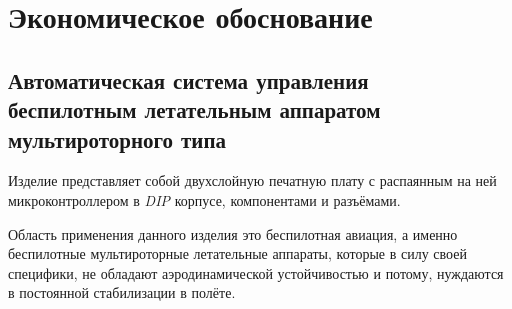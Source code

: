 \section{Экономическое обоснование}








\subsection{Автоматическая система управления \\
  беспилотным летательным аппаратом\\
мультироторного типа}

Изделие представляет собой двухслойную печатную плату с распаянным на
ней микроконтроллером в \textit{DIP} корпусе, компонентами и
разъёмами.

Область применения данного изделия это беспилотная авиация, а именно
беспилотные мультироторные летательные аппараты, которые в силу своей
специфики, не обладают аэродинамической устойчивостью и потому,
нуждаются в постоянной стабилизации в полёте.

